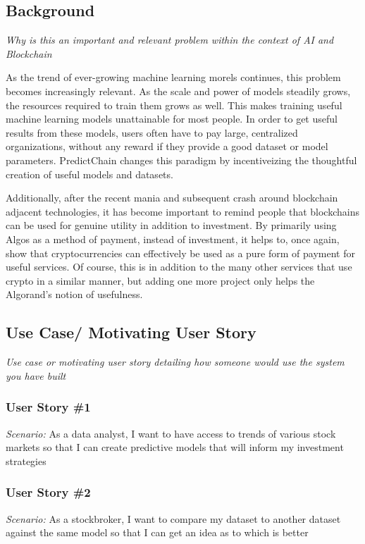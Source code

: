 \documentclass{article}
\begin{document}
    \subsection{Background}
    \emph{Why is this an important and relevant problem within the context of AI and Blockchain}

    As the trend of ever-growing machine learning morels continues, this problem becomes increasingly relevant.
    As the scale and power of models steadily grows, the resources required to train them grows as well.  This makes training
    useful machine learning models unattainable for most people.  In order to get useful results from these models,
    users often have to pay large, centralized organizations, without any reward if they provide a good dataset or model
    parameters.  PredictChain changes this paradigm by incentiveizing the thoughtful creation of useful models and
    datasets.

    Additionally, after the recent mania and subsequent crash around blockchain adjacent technologies, it has become
    important to remind people that blockchains can be used for genuine utility in addition to investment.  By primarily
    using Algos as a method of payment, instead of investment, it helps to, once again, show that cryptocurrencies can
    effectively be used as a pure form of payment for useful services.  Of course, this is in addition to the many other
    services that use crypto in a similar manner, but adding one more project only helps the Algorand's notion of usefulness.


    \subsection{Use Case/ Motivating User Story}
    \emph{Use case or motivating user story detailing how someone would use the system you have built}

    \subsubsection*{User Story \#1}
    \textit{Scenario:} As a data analyst, I want to have access to trends of various stock markets so that I can create
    predictive models that will inform my investment strategies

    \subsubsection*{User Story \#2}
    \textit{Scenario:} As a stockbroker, I want to compare my dataset to another dataset against the same model so that
    I can get an idea as to which is better
\end{document}
